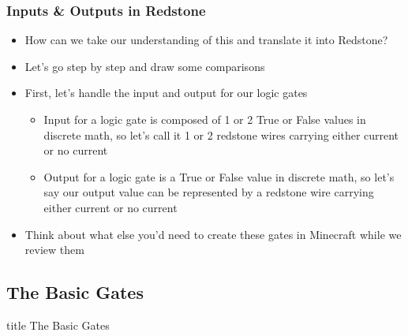 \documentclass{beamer}
\begin{document}
            \begin{frame}
                \frametitle{Inputs \& Outputs in Redstone}
                \begin{itemize}
                    \item How can we take our understanding of this and translate it into Redstone?
                    \item Let's go step by step and draw some comparisons
                    \item First, let's handle the input and output for our logic gates
                    \begin{itemize}
                        \item Input for a logic gate is composed of 1 or 2 True or False values in discrete math, so let's call it 1 or 2 redstone wires carrying either current or no current
                        \item Output for a logic gate is a True or False value in discrete math, so let's say our output value can be represented by a redstone wire carrying either current or no current
                    \end{itemize}
                    \item Think about what else you'd need to create these gates in Minecraft while we review them
                \end{itemize}
            \end{frame}
            
        \subsection{The Basic Gates}
        
        
            
            \begin{frame}
                \vfill
                \centering
                \begin{beamercolorbox}[sep=8pt,center,shadow=true,rounded=true]{title}
                    The Basic Gates\par%
                \end{beamercolorbox}
                \vfill
             \end{frame}
            
\end{document}
